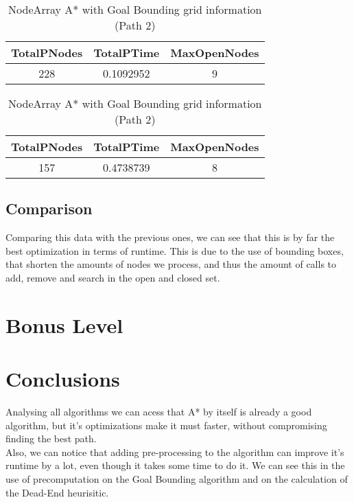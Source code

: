 \documentclass{article}
\begin{document}
  \begin{table}[h!]
    \parbox{.45\linewidth}{
        \centering
        \caption{NodeArray A* with Goal Bounding grid information (Path 1)}
        \label{tab:tableGoalBoundingGrid1}
        \begin{tabular}{c|c|c}
          \textbf{TotalPNodes} & \textbf{TotalPTime} & \textbf{MaxOpenNodes}\\
          \hline
          228 & 0.1092952 & 9\\
        \end{tabular}
    }
    \hfil
    \parbox{.45\linewidth}{
        \centering
        \caption{NodeArray A* with Goal Bounding grid information (Path 2)}
        \label{tab:tableGoalBoundingGrid2}
        \begin{tabular}{c|c|c}
          \textbf{TotalPNodes} & \textbf{TotalPTime} & \textbf{MaxOpenNodes}\\
          \hline
          157 & 0.4738739 & 8\\
        \end{tabular}
    }
  \end{table}

  \subsection{Comparison}
  Comparing this data with the previous ones, we can see that this is by far the best optimization in terms of runtime. This is due to the use of bounding boxes,
  that shorten the amounts of nodes we process, and thus the amount of calls to add, remove and search in the open and closed set.\\

  \section{Bonus Level}
  \section{Conclusions}
  Analysing all algorithms we can acess that A* by itself is already a good algorithm, but it's optimizations make it must faster, without compromising
  finding the best path. \\
  Also, we can notice that adding pre-processing to the algorithm can improve it's runtime by a lot, 
  even though it takes some time to do it. We can see this in the use of precomputation on the Goal Bounding  algorithm and 
  on the calculation of the Dead-End heurisitic. 
\end{document}
